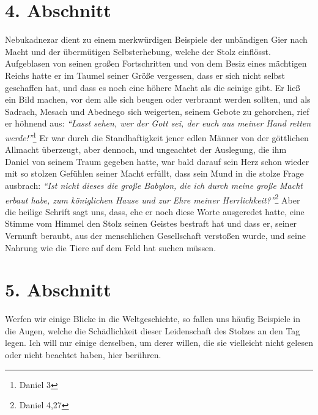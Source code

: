 \section{4. Abschnitt} \label{kap8_ab4}

Nebukadnezar dient zu einem merkwürdigen Beispiele
der unbändigen Gier nach
Macht und der übermütigen Selbsterhebung, welche der Stolz einflösst.
Aufgeblasen
von seinen großen Fortschritten und von dem Besiz eines mächtigen Reichs hatte
er im Taumel seiner Größe vergessen, dass er sich nicht selbst geschaffen hat,
und dass es noch eine höhere Macht als die seinige gibt. Er ließ ein Bild
machen,
vor dem alle sich beugen oder verbrannt werden sollten, und als
Sadrach, Mesach
und Abednego sich weigerten, seinem Gebote zu
gehorchen, rief er höhnend aus:
\textit{"`Lasst sehen, wer der Gott sei, der euch aus meiner Hand retten
werde!"'}\footnote{Daniel 3}
Er war durch die Standhaftigkeit jener edlen Männer
von der göttlichen Allmacht überzeugt, aber dennoch,
und ungeachtet der
Auslegung, die ihm Daniel von seinem Traum gegeben
hatte, war bald darauf sein
Herz schon wieder mit so stolzen Gefühlen seiner Macht erfüllt, dass sein Mund
in
die stolze Frage ausbrach:
\textit{"`Ist nicht dieses die große Babylon, die ich
durch meine große Macht erbaut habe, zum königlichen Hause und zur Ehre meiner
Herrlichkeit?"'}\footnote{Daniel 4,27}
Aber die heilige Schrift sagt uns, dass, ehe
er noch diese Worte ausgeredet hatte, eine Stimme vom Himmel den Stolz seinen
Geistes bestraft hat und dass er, seiner Vernunft beraubt, aus der menschlichen
Gesellschaft verstoßen wurde, und seine Nahrung wie die Tiere auf dem
Feld hat suchen müssen.

\section{5. Abschnitt} \label{kap8_ab5}

Werfen wir einige Blicke in die Weltgeschichte, so fallen uns häufig Beispiele
in die Augen, welche die Schädlichkeit dieser Leidenschaft des Stolzes an den
Tag legen. Ich will nur einige derselben, um derer willen, die sie
vielleicht
nicht gelesen oder nicht beachtet haben, hier berühren.

